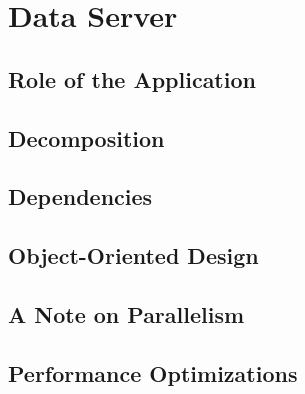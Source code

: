 \chapter{Data Server}

\section{Role of the Application}

\section{Decomposition}

\section{Dependencies}

\section{Object-Oriented Design}

\section{A Note on Parallelism}

\section{Performance Optimizations}
